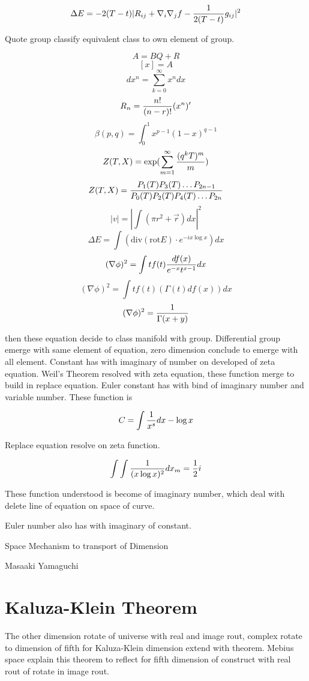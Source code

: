 \documentclass{jsarticle}
\begin{document}
$$ \Delta E = - 2(T- t)|R_{ij} + \nabla_{i} \nabla_{j} f - {1 \over 2(T - t)}g_{ij}|^2 $$

  Quote group classify equivalent class to own element of group.

  $$ A = BQ + R $$
  $$ [x] = A $$
  $$ dx^n = \sum^\infty_{k=0} x^n dx $$
  $$ R_{n} = {n! \over (n - r)!} (x^n)' $$
  $$ \beta (p,q) = \int^1_0 x^{p-1} (1 - x)^{q-1} $$
  $$ Z(T,X) = \mathrm{exp} (\sum^\infty_{m=1}{(q^k T)^m \over m}) $$
  $$ Z(T,X) = {P_{1}(T) P_{3}(T) \dots P_{2n-1} \over  P_{0}(T) P_{2}(T) P_{4}(T) \dots P_{2n}} $$
  $$ |v| = |\int (\pi r^2 + \vec{r})dx|^2 $$
  $$ \Delta E = \int (\mathrm{div} (\mathrm{rot} E) \cdot e^{-ix \log x}) dx $$
  $$ (\nabla \phi)^2 = \int tf(t){df(x) \over e^{-x} t^{x - 1}} dx $$
  $$ (\nabla \phi)^2 = \int tf(t)(\Gamma(t)df(x)) dx $$
  $$ (\nabla \phi)^2 = {1 \over \Gamma(x + y)} $$

  then these equation decide to class manifold with group.
  Differential group emerge with same element of equation, zero dimension conclude to emerge with all element.
  Constant has with imaginary of number on developed of zeta equation. Weil's Theorem resolved with zeta equation,
these function merge to build in replace equation. Euler constant has with bind of imaginary number and variable 
number. These function is

$$ C = \int {1 \over x^s}dx - \log x $$

  Replace equation resolve on zeta function.

  $$ \int \int {1 \over (x \log x)^2}dx_{m} = {1 \over 2}i $$

  These function understood is become of imaginary number, which deal with delete line of equation on space of curve.

Euler number also has with imaginary of constant.


\newpage
\begin{center}
\large	Space Mechanism to transport of Dimension
\end{center}
\begin{center}Masaaki Yamaguchi
\end{center}


\section{Kaluza-Klein Theorem}

  The other dimension rotate of universe with real and image rout, complex rotate to dimension of fifth for
Kaluza-Klein dimension extend with theorem. Mebius space explain this theorem to reflect for fifth dimension
of construct with real rout of rotate in image rout.
\end{document}
